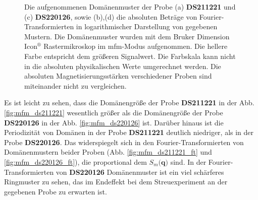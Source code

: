 \begin{figure}[H]
    \centering
    \subfloat[]{\hspace{1mm}\label{fig:mfm_ds211221_ft}}
    \hspace{1cm}
    \subfloat[]{\hspace{1mm}\label{fig:mfm_ds220126_ft}}
    \caption{Die aufgenommenen Domänenmuster der Probe (a) \textbf{DS211221} und (c) \textbf{DS220126}, sowie (b),(d) die absoluten Beträge von Fourier-Transformierten in logarithmischer Darstellung von gegebenen Mustern. Die Domänenmuster wurden mit dem Bruker Dimension Icon$^{\text{®}}$ Rastermikroskop im \gls{mfm}-Modus aufgenommen. Die hellere Farbe entspricht dem größeren Signalwert. Die Farbskala kann nicht in die absoluten physikalischen Werte umgerechnet werden. Die absoluten Magnetisierungsstärken verschiedener Proben sind miteinander nicht zu vergleichen.}
    \label{fig:mfm_amplitude_ft}
\end{figure}
\noindent
Es ist leicht zu sehen, dass die Domänengröße der Probe \textbf{DS211221} in der Abb. \ref{fig:mfm_ds211221} wesentlich größer als die Domänengröße der Probe \textbf{DS220126} in der Abb. \ref{fig:mfm_ds220126} ist. Darüber hinaus ist die Periodizität von Domänen in der Probe \textbf{DS211221} deutlich niedriger, als in der Probe  \textbf{DS220126}. Das widerspiegelt sich in den Fourier-Transformierten von Domänenmustern beider Proben (Abb. \ref{fig:mfm_ds211221_ft} und \ref{fig:mfm_ds220126_ft}), die proportional dem $S_m(\mathbf{q)}$ sind. In der Fourier-Transformierten von \textbf{DS220126} Domänenmuster ist ein viel schärferes Ringmuster zu sehen, das im Endeffekt bei dem Streuexperiment an der gegebenen Probe zu erwarten ist.

